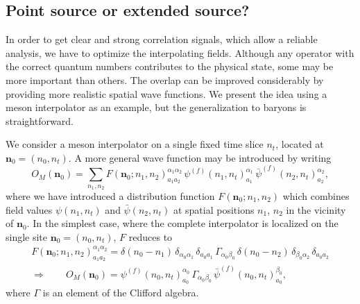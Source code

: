 \subsection{Point source or extended source?}

In order to get clear and strong correlation signals, which allow a reliable
analysis, we have to optimize the interpolating fields. Although any operator
with the correct quantum numbers contributes to the physical state, some may be
more important than others. The overlap can be improved considerably by
providing more realistic spatial wave functions. We present the idea using a
meson interpolator as an example, but the generalization to baryons is
straightforward.

We consider a meson interpolator on a single fixed time slice $n_t$, located at
$\mathbf{n}_0 = (n_0, n_t)$. A more general wave function may be introduced by
writing
\begin{equation}
  O_M(\mathbf{n}_0) = \sum_{n_1,n_2}
    F(\mathbf{n}_0; n_1, n_2)^{\alpha_1\alpha_2}_{a_1a_2}\,
    \psi^{(f)}(n_1, n_t)^{\alpha_1}_{a_1}\,
    \bar\psi^{(f)}(n_2, n_t)^{\alpha_2}_{a_2} ,
\end{equation}
where we have introduced a distribution function $F(\mathbf{n}_0; n_1, n_2)$
which combines field values $\psi(n_1, n_t)$ and $\bar\psi(n_2, n_t)$ at
spatial positions $n_1$, $n_2$ in the vicinity of $\mathbf{n}_0$. In the
simplest case, where the complete interpolator is localized on the single site
$\mathbf{n}_0 = (n_0, n_t)$, $F$ reduces to
\begin{equation}
  \begin{gathered}
    F(\mathbf{n}_0; n_1, n_2)^{\alpha_1\alpha_2}_{a_1a_2}
    = \delta(n_0 - n_1)\, \delta_{\alpha_0\alpha_1}\, \delta_{a_0a_1}\,
      \Gamma_{\alpha_0\beta_0}\, \delta(n_0 - n_2)\, \delta_{\beta_0\alpha_2}\,
      \delta_{a_0a_2} \\[2mm]
    \Longrightarrow\qquad
    O_M(\mathbf{n}_0) = \psi^{(f)}(n_0, n_t)^{\alpha_0}_{a_0}\,
      \Gamma_{\alpha_0\beta_0}\, \bar\psi^{(f)}(n_0, n_t)^{\beta_0}_{a_0} ,
  \end{gathered}
\end{equation}
where $\Gamma$ is an element of the Clifford algebra.

